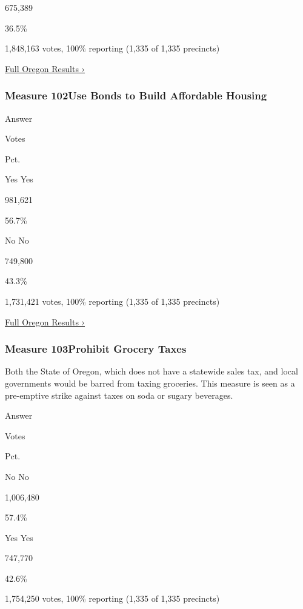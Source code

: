 675,389

36.5\%

1,848,163 votes, 100\% reporting (1,335 of 1,335 precincts)

\href{https://www.nytimes3xbfgragh.onion/interactive/2018/11/06/us/elections/results-oregon-elections.html}{Full
Oregon Results ›}

\hypertarget{measure-102use-bonds-to-build-affordable-housing}{%
\subsubsection{Measure 102Use Bonds to Build Affordable
Housing}\label{measure-102use-bonds-to-build-affordable-housing}}

Answer

Votes

Pct.

 Yes Yes

981,621

56.7\%

 No No

749,800

43.3\%

1,731,421 votes, 100\% reporting (1,335 of 1,335 precincts)

\href{https://www.nytimes3xbfgragh.onion/interactive/2018/11/06/us/elections/results-oregon-elections.html}{Full
Oregon Results ›}

\hypertarget{measure-103prohibit-grocery-taxes}{%
\subsubsection{Measure 103Prohibit Grocery
Taxes}\label{measure-103prohibit-grocery-taxes}}

Both the State of Oregon, which does not have a statewide sales tax, and
local governments would be barred from taxing groceries. This measure is
seen as a pre-emptive strike against taxes on soda or sugary beverages.

Answer

Votes

Pct.

 No No

1,006,480

57.4\%

 Yes Yes

747,770

42.6\%

1,754,250 votes, 100\% reporting (1,335 of 1,335 precincts)

